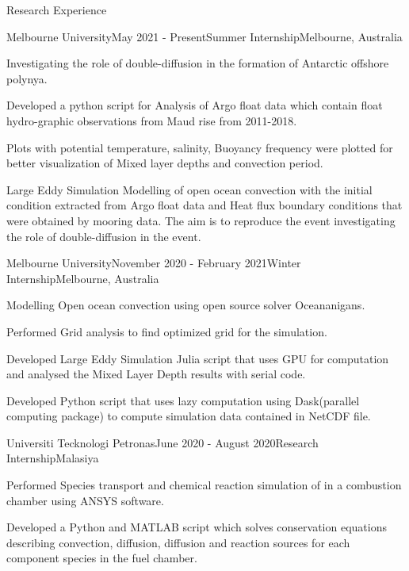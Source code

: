 \documentclass{resume} %
\begin{document}
\begin{rSection}{Research Experience}

\begin{rSubsection}{Melbourne University}{May 2021 - Present}{Summer Internship}{Melbourne, Australia}
\item Investigating the role of double-diffusion in the formation of Antarctic offshore polynya.
\item Developed a python script for Analysis of Argo float data which contain float hydro-graphic observations from Maud rise from 2011-2018. 
\item Plots with potential temperature, salinity, Buoyancy frequency were plotted for better visualization of Mixed layer depths and convection period.
\item Large Eddy Simulation Modelling of open ocean convection with the initial condition extracted from Argo float data and Heat flux boundary conditions that were obtained by mooring data. The aim is to reproduce the event investigating the role of double-diffusion in the event. 
\end{rSubsection}
\begin{rSubsection}{Melbourne University}{November 2020 - February 2021}{Winter Internship}{Melbourne, Australia}
\item Modelling Open ocean convection using open source solver Oceananigans.
\item Performed Grid analysis to find optimized grid for the simulation. 
\item Developed Large Eddy Simulation Julia script that uses GPU for computation and analysed the Mixed Layer Depth results with serial code. 
\item Developed Python script that uses lazy computation using Dask(parallel computing package) to compute simulation data contained in NetCDF file.
 
\end{rSubsection}

\begin{rSubsection}{Universiti Tecknologi Petronas}{June 2020 - August 2020}{Research Internship}{Malasiya}
\item Performed Species transport and chemical reaction simulation of in a combustion chamber using ANSYS software. 
\item Developed a Python and MATLAB script which solves conservation equations describing convection, diffusion, diffusion and reaction sources for each component species in the fuel chamber.
\end{rSubsection}


\end{rSection}
\end{document}

